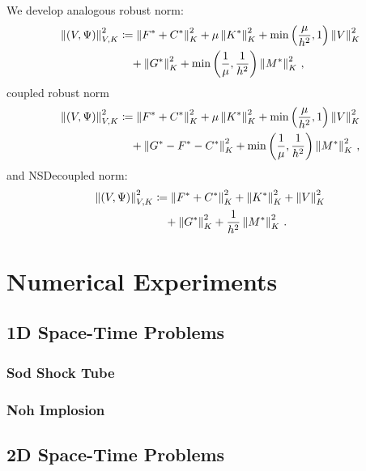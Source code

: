 \documentclass[Dissertation.tex]{subfiles}
\begin{document}
We develop analogous robust norm:
\begin{align*}
\left\| \left( V,\Psi \right) \right\|_{V,K}^2 &\coloneqq
\left\| F^*+C^* \right\|_K^2
+ \mu\left\| K^* \right\|_K^2
+ \min\left( \frac{\mu}{h^2},1 \right)\left\| V \right\|^2_K
\\\nonumber&\quad
+ \left\| G^* \right\|_K^2
+ \min\left( \frac{1}{\mu},\frac{1}{h^2} \right)\left\| M^* \right\|_K^2\,,
\end{align*}
coupled robust norm
\begin{align*}
\left\| \left( V,\Psi \right) \right\|_{V,K}^2 &\coloneqq
\left\| F^*+C^* \right\|_K^2
+ \mu\left\| K^* \right\|_K^2
+ \min\left( \frac{\mu}{h^2},1 \right)\left\| V \right\|^2_K
\\\nonumber&\quad
+ \left\| G^*-F^*-C^* \right\|_K^2
+ \min\left( \frac{1}{\mu},\frac{1}{h^2} \right)\left\| M^* \right\|_K^2\,,
\end{align*}
and NSDecoupled norm:
\begin{align*}
\left\| \left( V,\Psi \right) \right\|_{V,K}^2 &\coloneqq
\left\| F^*+C^* \right\|_K^2
+ \left\| K^* \right\|_K^2
+ \left\| V \right\|^2_K
\\\nonumber&\quad
+ \left\| G^* \right\|_K^2
+ \frac{1}{h^2}\left\| M^* \right\|_K^2\,.
\end{align*}


\section{Numerical Experiments}
\subsection{1D Space-Time Problems}
\subsubsection{Sod Shock Tube}

\subsubsection{Noh Implosion}

\subsection{2D Space-Time Problems}
\end{document}
